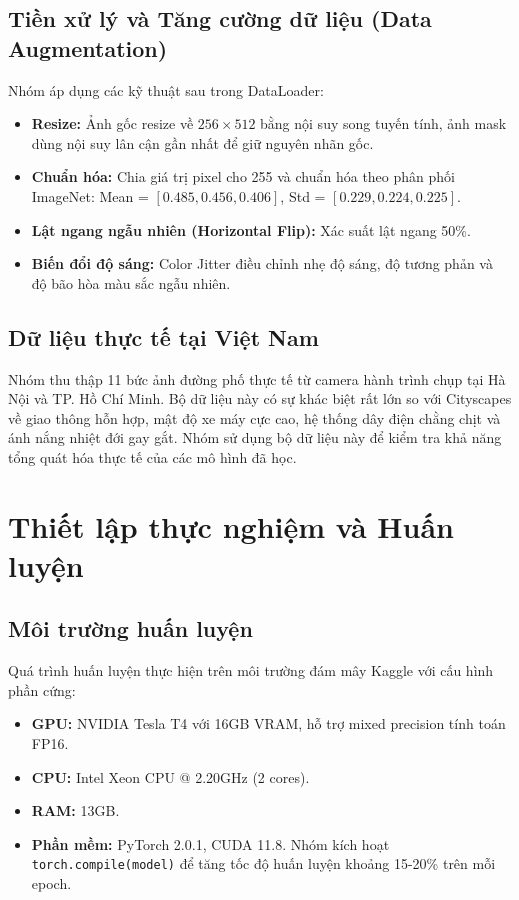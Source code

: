 \documentclass[a4paper,12pt]{report}
\begin{document}
\section{Tiền xử lý và Tăng cường dữ liệu (Data Augmentation)}
Nhóm áp dụng các kỹ thuật sau trong DataLoader:
\begin{itemize}
    \item \textbf{Resize:} Ảnh gốc resize về $256 \times 512$ bằng nội suy song tuyến tính, ảnh mask dùng nội suy lân cận gần nhất để giữ nguyên nhãn gốc.
    \item \textbf{Chuẩn hóa:} Chia giá trị pixel cho 255 và chuẩn hóa theo phân phối ImageNet: Mean = $[0.485, 0.456, 0.406]$, Std = $[0.229, 0.224, 0.225]$.
    \item \textbf{Lật ngang ngẫu nhiên (Horizontal Flip):} Xác suất lật ngang 50\%.
    \item \textbf{Biến đổi độ sáng:} Color Jitter điều chỉnh nhẹ độ sáng, độ tương phản và độ bão hòa màu sắc ngẫu nhiên.
\end{itemize}

\section{Dữ liệu thực tế tại Việt Nam}
Nhóm thu thập 11 bức ảnh đường phố thực tế từ camera hành trình chụp tại Hà Nội và TP. Hồ Chí Minh. Bộ dữ liệu này có sự khác biệt rất lớn so với Cityscapes về giao thông hỗn hợp, mật độ xe máy cực cao, hệ thống dây điện chằng chịt và ánh nắng nhiệt đới gay gắt. Nhóm sử dụng bộ dữ liệu này để kiểm tra khả năng tổng quát hóa thực tế của các mô hình đã học.

\newpage

\chapter{Thiết lập thực nghiệm và Huấn luyện}
\section{Môi trường huấn luyện}
Quá trình huấn luyện thực hiện trên môi trường đám mây Kaggle với cấu hình phần cứng:
\begin{itemize}
    \item \textbf{GPU:} NVIDIA Tesla T4 với 16GB VRAM, hỗ trợ mixed precision tính toán FP16.
    \item \textbf{CPU:} Intel Xeon CPU @ 2.20GHz (2 cores).
    \item \textbf{RAM:} 13GB.
    \item \textbf{Phần mềm:} PyTorch 2.0.1, CUDA 11.8. Nhóm kích hoạt \texttt{torch.compile(model)} để tăng tốc độ huấn luyện khoảng 15-20\% trên mỗi epoch.
\end{itemize}
\end{document}
